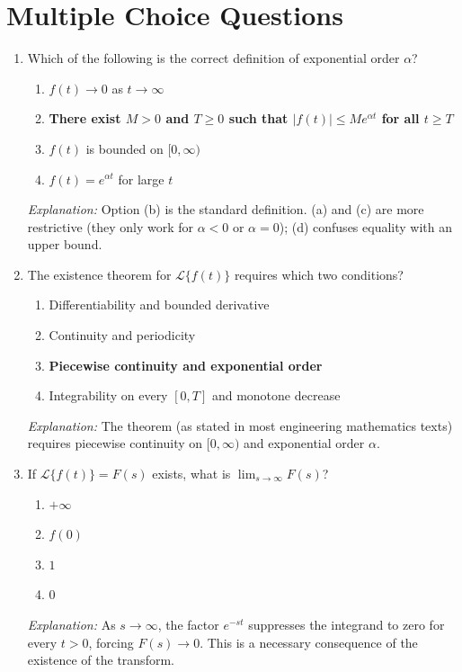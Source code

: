 \documentclass[12pt,a4paper]{article}
\begin{document}
\section{Multiple Choice Questions}

\begin{enumerate}[label=\textbf{MCQ \arabic*.}]

\item Which of the following is the correct definition of exponential order $\alpha$?
\begin{enumerate}[label=(\alph*)]
  \item $f(t) \to 0$ as $t \to \infty$
  \item \textbf{There exist $M > 0$ and $T \geq 0$ such that $|f(t)| \leq M e^{\alpha t}$ for all $t \geq T$}
  \item $f(t)$ is bounded on $[0, \infty)$
  \item $f(t) = e^{\alpha t}$ for large $t$
\end{enumerate}
\textit{Explanation:} Option (b) is the standard definition. (a) and (c) are more restrictive
(they only work for $\alpha < 0$ or $\alpha = 0$); (d) confuses equality with an upper bound.

\item The existence theorem for $\mathcal{L}\{f(t)\}$ requires which two conditions?
\begin{enumerate}[label=(\alph*)]
  \item Differentiability and bounded derivative
  \item Continuity and periodicity
  \item \textbf{Piecewise continuity and exponential order}
  \item Integrability on every $[0, T]$ and monotone decrease
\end{enumerate}
\textit{Explanation:} The theorem (as stated in most engineering mathematics texts) requires
piecewise continuity on $[0,\infty)$ and exponential order $\alpha$.

\item If $\mathcal{L}\{f(t)\} = F(s)$ exists, what is $\lim_{s \to \infty} F(s)$?
\begin{enumerate}[label=(\alph*)]
  \item $+\infty$
  \item $f(0)$
  \item $1$
  \item \textbf{$0$}
\end{enumerate}
\textit{Explanation:} As $s \to \infty$, the factor $e^{-st}$ suppresses the integrand to zero
for every $t > 0$, forcing $F(s) \to 0$. This is a necessary consequence of the existence of
the transform.


\end{enumerate}
\end{document}
